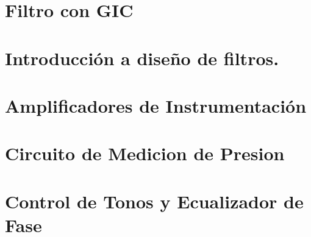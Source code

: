 







\tableofcontents
\newpage


\section{Filtro con GIC}
	
	\newpage

\section{Introducción a diseño de filtros.}
	
	\newpage
	
\section{Amplificadores de Instrumentación}
	
	\newpage

\section{Circuito de Medicion de Presion}
	
	\newpage
	
\section{Control de Tonos y Ecualizador de Fase}
	
	\newpage
	
	\newpage
	
